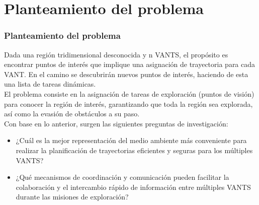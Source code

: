 \documentclass[
  24pt, %
  aspectratio=169, %
]{beamer}
\begin{document}
\section{Planteamiento del problema}
\begin{frame}
  \frametitle{Planteamiento del problema}
  \justifying
  \scriptsize Dada una región tridimensional desconocida y n VANTS, el propósito es encontrar puntos de interés que implique una asignación de trayectoria para cada VANT. En el camino se descubrirán nuevos puntos de interés, haciendo de esta una lista de tareas dinámicas.\\
  El problema consiste en la asignación de tareas de exploración (puntos de visión) para conocer la región de interés, garantizando que toda la región sea explorada, así como la evasión de obstáculos a su paso.\\
  \bigskip %
  \pause
  \scriptsize Con base en lo anterior, surgen las siguientes preguntas de investigación:
  \pause
  \begin{itemize}
    \pause
  \item \scriptsize ¿Cuál es la mejor representación del medio ambiente más conveniente para realizar la planificación de trayectorias eficientes y seguras para los múltiples VANTS?%
    \pause
  \item \scriptsize ¿Qué mecanismos de coordinación y comunicación pueden facilitar la colaboración y el intercambio rápido de información entre múltiples VANTS durante las misiones de exploración?
  \end{itemize}
  

\end{frame}
\end{document}
